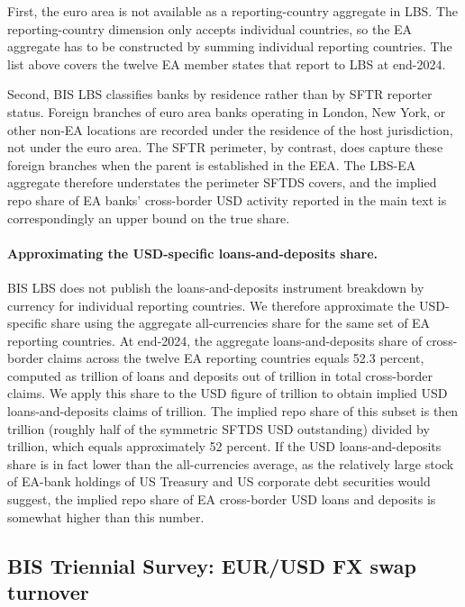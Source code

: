 \documentclass[english, 12pt, oneside]{article}
\begin{document}
First, the euro area is not available as a reporting-country aggregate in LBS. The reporting-country dimension only accepts individual countries, so the EA aggregate has to be constructed by summing individual reporting countries. The list above covers the twelve EA member states that report to LBS at end-2024.

Second, BIS LBS classifies banks by residence rather than by SFTR reporter status. Foreign branches of euro area banks operating in London, New York, or other non-EA locations are recorded under the residence of the host jurisdiction, not under the euro area. The SFTR perimeter, by contrast, does capture these foreign branches when the parent is established in the EEA. The LBS-EA aggregate therefore understates the perimeter SFTDS covers, and the implied repo share of EA banks' cross-border USD activity reported in the main text is correspondingly an upper bound on the true share.

\paragraph{Approximating the USD-specific loans-and-deposits share.} BIS LBS does not publish the loans-and-deposits instrument breakdown by currency for individual reporting countries. We therefore approximate the USD-specific share using the aggregate all-currencies share for the same set of EA reporting countries. At end-2024, the aggregate loans-and-deposits share of cross-border claims across the twelve EA reporting countries equals 52.3 percent, computed as  trillion of loans and deposits out of  trillion in total cross-border claims. We apply this share to the  USD figure of  trillion to obtain implied USD loans-and-deposits claims of  trillion. The implied repo share of this subset is then  trillion (roughly half of the symmetric SFTDS USD outstanding) divided by  trillion, which equals approximately 52 percent. If the USD loans-and-deposits share is in fact lower than the all-currencies average, as the relatively large stock of EA-bank holdings of US Treasury and US corporate debt securities would suggest, the implied repo share of EA cross-border USD loans and deposits is somewhat higher than this number.

\subsection*{BIS Triennial Survey: EUR/USD FX swap turnover}
\end{document}
